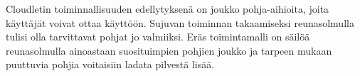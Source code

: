 Cloudletin toiminnallisuuden edellytyksenä on joukko pohja-aihioita, joita käyttäjät voivat ottaa käyttöön. 
Sujuvan toiminnan takaamiseksi reunasolmulla tulisi olla tarvittavat pohjat jo valmiiksi. 
Eräs toimintamalli on säilöä reunasolmulla ainoastaan suosituimpien pohjien joukko ja tarpeen mukaan puuttuvia pohjia voitaisiin ladata pilvestä lisää.






